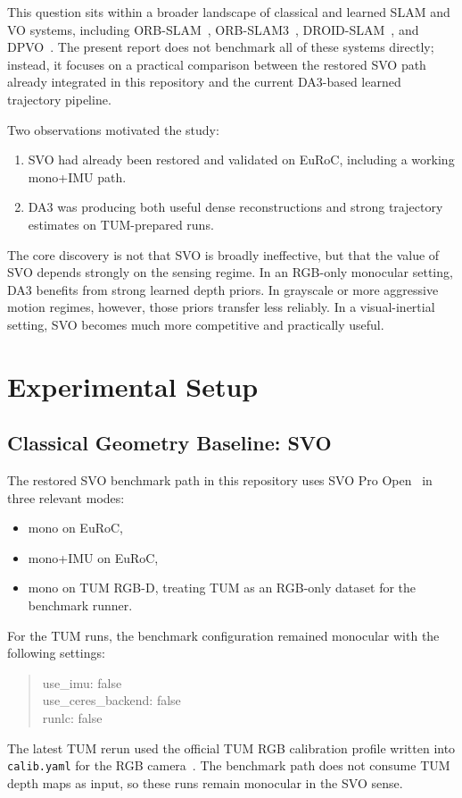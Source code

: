 \documentclass[conference]{IEEEtran}
\newcommand{\code}[1]{\mbox{\texttt{#1}}}
\begin{document}
This question sits within a broader landscape of classical and learned SLAM and VO systems, including ORB-SLAM~\cite{mur2015orbslam}, ORB-SLAM3~\cite{campos2021orbslam3}, DROID-SLAM~\cite{teed2021droidslam}, and DPVO~\cite{teed2023dpvo}. The present report does not benchmark all of these systems directly; instead, it focuses on a practical comparison between the restored SVO path already integrated in this repository and the current DA3-based learned trajectory pipeline.

Two observations motivated the study:
\begin{enumerate}
\item SVO had already been restored and validated on EuRoC, including a working mono+IMU path.
\item DA3 was producing both useful dense reconstructions and strong trajectory estimates on TUM-prepared runs.
\end{enumerate}

The core discovery is not that SVO is broadly ineffective, but that the value of SVO depends strongly on the sensing regime. In an RGB-only monocular setting, DA3 benefits from strong learned depth priors. In grayscale or more aggressive motion regimes, however, those priors transfer less reliably. In a visual-inertial setting, SVO becomes much more competitive and practically useful.

\section{Experimental Setup}

\subsection{Classical Geometry Baseline: SVO}
The restored SVO benchmark path in this repository uses SVO Pro Open~\cite{forster2017svo} in three relevant modes:
\begin{itemize}
\item mono on EuRoC,
\item mono+IMU on EuRoC,
\item mono on TUM RGB-D, treating TUM as an RGB-only dataset for the benchmark runner.
\end{itemize}

For the TUM runs, the benchmark configuration remained monocular with the following settings:
\begin{quote}
\ttfamily\small
use\_imu: false\\
use\_ceres\_backend: false\\
runlc: false
\end{quote}
The latest TUM rerun used the official TUM RGB calibration profile written into \code{calib.yaml} for the RGB camera~\cite{tumrgbdformats}. The benchmark path does not consume TUM depth maps as input, so these runs remain monocular in the SVO sense.
\end{document}
